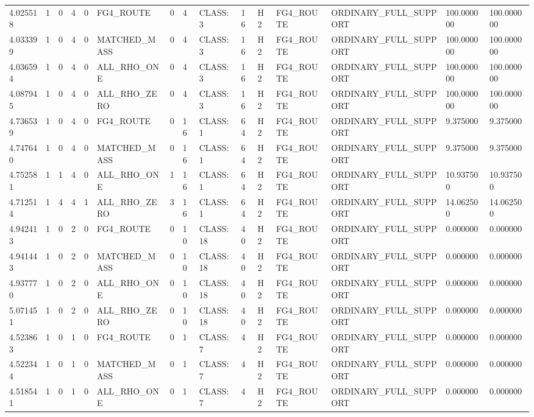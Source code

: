 \begin{tabular}{lllllllllllllll}
4.025518 & 1 & 0 & 4 & 0 & FG4\_ROUTE & 0 & 4 & CLASS:3 & 16 & H2 & FG4\_ROUTE & ORDINARY\_FULL\_SUPPORT & 100.000000 & 100.000000 \\
4.033399 & 1 & 0 & 4 & 0 & MATCHED\_MASS & 0 & 4 & CLASS:3 & 16 & H2 & FG4\_ROUTE & ORDINARY\_FULL\_SUPPORT & 100.000000 & 100.000000 \\
4.036594 & 1 & 0 & 4 & 0 & ALL\_RHO\_ONE & 0 & 4 & CLASS:3 & 16 & H2 & FG4\_ROUTE & ORDINARY\_FULL\_SUPPORT & 100.000000 & 100.000000 \\
4.087945 & 1 & 0 & 4 & 0 & ALL\_RHO\_ZERO & 0 & 4 & CLASS:3 & 16 & H2 & FG4\_ROUTE & ORDINARY\_FULL\_SUPPORT & 100.000000 & 100.000000 \\
4.736539 & 1 & 0 & 4 & 0 & FG4\_ROUTE & 0 & 16 & CLASS:1 & 64 & H2 & FG4\_ROUTE & ORDINARY\_FULL\_SUPPORT & 9.375000 & 9.375000 \\
4.747640 & 1 & 0 & 4 & 0 & MATCHED\_MASS & 0 & 16 & CLASS:1 & 64 & H2 & FG4\_ROUTE & ORDINARY\_FULL\_SUPPORT & 9.375000 & 9.375000 \\
4.752581 & 1 & 1 & 4 & 0 & ALL\_RHO\_ONE & 1 & 16 & CLASS:1 & 64 & H2 & FG4\_ROUTE & ORDINARY\_FULL\_SUPPORT & 10.937500 & 10.937500 \\
4.712514 & 1 & 4 & 4 & 1 & ALL\_RHO\_ZERO & 3 & 16 & CLASS:1 & 64 & H2 & FG4\_ROUTE & ORDINARY\_FULL\_SUPPORT & 14.062500 & 14.062500 \\
4.942413 & 1 & 0 & 2 & 0 & FG4\_ROUTE & 0 & 10 & CLASS:18 & 40 & H2 & FG4\_ROUTE & ORDINARY\_FULL\_SUPPORT & 0.000000 & 0.000000 \\
4.941443 & 1 & 0 & 2 & 0 & MATCHED\_MASS & 0 & 10 & CLASS:18 & 40 & H2 & FG4\_ROUTE & ORDINARY\_FULL\_SUPPORT & 0.000000 & 0.000000 \\
4.937770 & 1 & 0 & 2 & 0 & ALL\_RHO\_ONE & 0 & 10 & CLASS:18 & 40 & H2 & FG4\_ROUTE & ORDINARY\_FULL\_SUPPORT & 0.000000 & 0.000000 \\
5.071451 & 1 & 0 & 2 & 0 & ALL\_RHO\_ZERO & 0 & 10 & CLASS:18 & 40 & H2 & FG4\_ROUTE & ORDINARY\_FULL\_SUPPORT & 0.000000 & 0.000000 \\
4.523863 & 1 & 0 & 1 & 0 & FG4\_ROUTE & 0 & 1 & CLASS:7 & 4 & H2 & FG4\_ROUTE & ORDINARY\_FULL\_SUPPORT & 0.000000 & 0.000000 \\
4.522344 & 1 & 0 & 1 & 0 & MATCHED\_MASS & 0 & 1 & CLASS:7 & 4 & H2 & FG4\_ROUTE & ORDINARY\_FULL\_SUPPORT & 0.000000 & 0.000000 \\
4.518541 & 1 & 0 & 1 & 0 & ALL\_RHO\_ONE & 0 & 1 & CLASS:7 & 4 & H2 & FG4\_ROUTE & ORDINARY\_FULL\_SUPPORT & 0.000000 & 0.000000 \\

\end{tabular}
